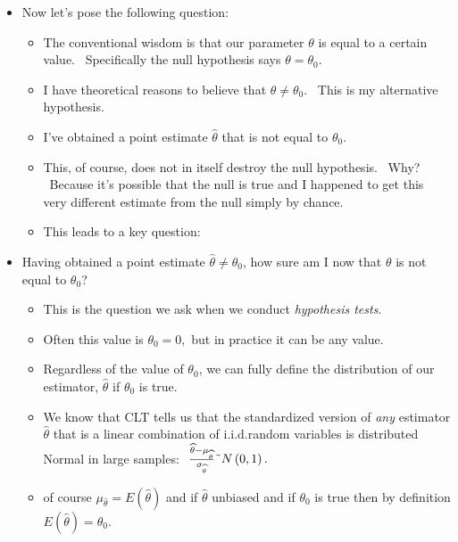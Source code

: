 \documentclass[11pt]{article}
\begin{document}
\begin{itemize}
\item Now let's pose the following question:

\begin{itemize}
\item The conventional wisdom is that our parameter $\theta $ is equal to a
certain value. \ Specifically the null hypothesis says $\theta =\theta _{0}.$

\item I have theoretical reasons to believe that $\theta \neq \theta _{0}.$
\ This is my alternative hypothesis.

\item I've obtained a point estimate $\widehat{\theta }$ that is not equal
to $\theta _{0}.$

\item This, of course, does not in itself destroy the null hypothesis. \
Why? \ Because it's possible that the null is true and I happened to get
this very different estimate from the null simply by chance.

\item This leads to a key question:
\end{itemize}

\item Having obtained a point estimate $\widehat{\theta }\neq \theta _{0}$,
how sure am I now that $\theta $ is not equal to $\theta _{0}$? \ 

\begin{itemize}
\item This is the question we ask when we conduct \textit{hypothesis tests}.

\item Often this value is $\theta _{0}=0,$ but in practice it can be any
value.

\item Regardless of the value of $\theta _{0}$, we can fully define the
distribution of our estimator, $\widehat{\theta }$ if $\theta _{0}$ is true$%
. $ \ 

\item We know that CLT tells us that the standardized version of \textit{any 
}estimator $\widehat{\theta }$ that is a linear combination of i.i.d.random
variables is distributed Normal in large samples: $\ \frac{\widehat{\theta }%
-\mu _{\widehat{\theta }}}{\sigma _{\widehat{\theta }}}\symbol{126}N\left(
0,1\right) .$

\item of course $\mu _{\widehat{\theta }}=E\left( \widehat{\theta }\right) $
and if $\widehat{\theta }$ unbiased and if $\theta _{0}$ is true then by
definition $E\left( \widehat{\theta }\right) =\theta _{0}.$


\end{itemize}
\end{itemize}
\end{document}
